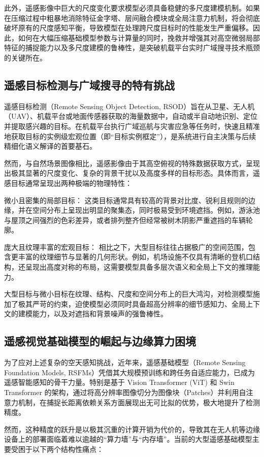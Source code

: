 此外，遥感影像中巨大的尺度变化要求模型必须具备稳健的多尺度建模机制。如果在压缩过程中粗暴地消除特征金字塔、层间融合模块或全局注意力机制，将会彻底破坏原有的尺度感知平衡，导致模型在处理跨尺度目标时的性能发生严重偏移。因此，如何在大幅压缩基础模型参数与计算量的同时，挽救并增强其对高空微弱局部特征的捕捉能力以及多尺度建模的鲁棒性，是突破机载平台实时广域搜寻技术瓶颈的关键所在。


\subsection{遥感目标检测与广域搜寻的特有挑战}
遥感目标检测（Remote Sensing Object Detection, RSOD）旨在从卫星、无人机（UAV）、机载平台或地面传感器获取的海量数据中，自动或半自动地识别、定位并提取感兴趣的目标。在机载平台执行广域巡航与灾害应急等任务时，快速且精准地获取目标的实例级宏观位置（即“目标实例框定”），是系统进行自主决策与后续精细化语义解译的首要基石。

然而，与自然场景图像相比，遥感影像由于其高空俯视的特殊数据获取方式，呈现出极其显著的尺度变化、复杂的背景干扰以及高度多样的目标形态。具体而言，遥感目标通常呈现出两种极端的物理特性：

微小且密集的局部目标： 这类目标通常具有较高的背景对比度、锐利且规则的边缘，并在空间分布上呈现出明显的聚集态，同时极易受到环境遮挡。例如，游泳池与屋顶之间强烈的色彩差异，或者排列整齐但经常被树木阴影严重遮挡的车辆轮廓。

庞大且纹理丰富的宏观目标： 相比之下，大型目标往往占据极广的空间范围，包含更丰富的纹理细节与显著的几何形状。例如，机场设施不仅具有清晰的登机口结构，还呈现出高度对称的布局，这需要模型具备多层次语义和全局上下文的推理能力。

大型目标与微小目标在纹理、结构、尺度和空间分布上的巨大鸿沟，对检测模型施加了极其严苛的约束，迫使模型必须同时具备超高分辨率的细节感知力、全局上下文的建模能力，以及对遮挡和背景噪声的强鲁棒性。

\subsection{遥感视觉基础模型的崛起与边缘算力困境}
为了应对上述复杂的空天感知挑战，近年来，遥感基础模型（Remote Sensing Foundation Models, RSFMs）凭借其大规模预训练和跨任务自适应能力，已成为遥感智能感知的骨干力量。特别是基于 Vision Transformer (ViT) 和 Swin Transformer 的架构，通过将高分辨率图像切分为图像块（Patches）并利用自注意力机制，在捕捉长距离依赖关系方面展现出无可比拟的优势，极大地提升了检测精度。

然而，这种精度的跃升是以极其沉重的计算开销为代价的，导致其在无人机等边缘设备上的部署面临着难以逾越的“算力墙”与“内存墙”。当前的大型遥感基础模型主要受困于以下两个结构性痛点：

